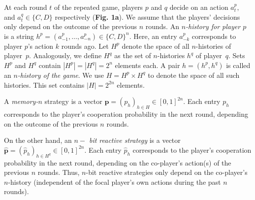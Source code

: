 \documentclass{article}
\theoremstyle{definition}
\begin{document}
At each round \(t\) of the repeated game, players \(p\) and \(q\) decide on an
action \(a^{p}_{t},\) and \(a^{q}_{t} \in \{C, D\}\) respectively (\textbf{Fig.
1a}). We assume that the players' decisions only depend on the outcome of the
previous \(n\) rounds. An {\it $n$-history for player $p$} is a string
$h^p=(a^p_{-1},\ldots,a^p_{-n})\!\in\!\{C,D\}^n$. Here, an entry $a^p_{-k}$
corresponds to player $p$'s action $k$ rounds ago. Let $H^p$ denote the space of
all $n$-histories of player~$p$. Analogously, we define $H^q$ as the set of
$n$-histories $h^q$ of player~$q$. Sets $H^p$ and $H^q$ contain
$|H^p|=|H^q|=2^{n}$ elements each. A pair $h\!=\!(h^p,h^q)$ is called an {\it
$n$-history of the game}. We use $H=H^p\times H^q$ to denote the space of all
such histories. This set contains $|H|=2^{2n}$ elements.

A {\it memory-$n$} strategy is a vector $\mathbf{p}=(p_h)_{h\in
H}\in[0,1]^{2n}$. Each entry $p_h$ corresponds to the player's cooperation
probability in the next round, depending on the outcome of the previous $n$
rounds.

On the other hand, an {\it $n-$ bit reactive strategy} is a vector
$\mathbf{\hat{p}}=(\hat{p}_h)_{h\in H^q}\in[0,1]^{2n}$. Each entry $\hat{p}_h$
corresponds to the player's cooperation probability in the next round,
depending on the co-player's action(s) of the previous \(n\) rounds. Thus,
\(n\)-bit reactive strategies only depend on the co-player's \(n\)-history
(independent of the focal player's own actions during the past \(n\) rounds).
\end{document}
